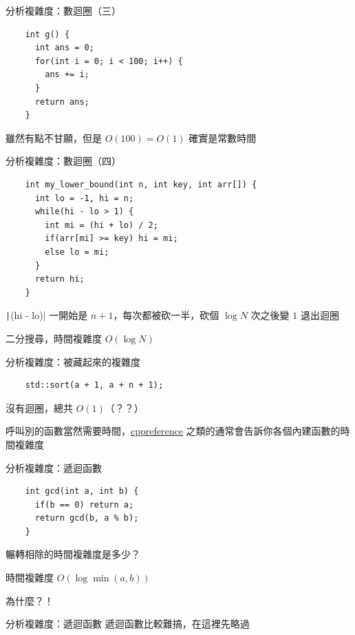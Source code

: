 \documentclass[aspectratio=169]{beamer}
\newcommand{\inc}[2][cpp]{\texttt|#2|}
\begin{document}
\begin{frame}[fragile]{分析複雜度：數迴圈（三）}
  \begin{verbatim}
    int g() {
      int ans = 0;
      for(int i = 0; i < 100; i++) {
        ans += i;
      }
      return ans;
    }
  \end{verbatim}

   {
    雖然有點不甘願，但是 $O(100) = O(1)$ 確實是常數時間
  }
\end{frame}

\begin{frame}[fragile]{分析複雜度：數迴圈（四）}
  \begin{verbatim}
    int my_lower_bound(int n, int key, int arr[]) {
      int lo = -1, hi = n;
      while(hi - lo > 1) {
        int mi = (hi + lo) / 2;
        if(arr[mi] >= key) hi = mi;
        else lo = mi;
      }
      return hi;
    }
  \end{verbatim}

   {
    \inc{(hi - lo)} 一開始是 $n + 1$，每次都被砍一半，砍個 $\log N$ 次之後變 $1$ 退出迴圈

    二分搜尋，時間複雜度 $O(\log N)$
  }
\end{frame}

\begin{frame}[fragile]{分析複雜度：被藏起來的複雜度}
  \begin{verbatim}
    std::sort(a + 1, a + n + 1);
  \end{verbatim}

  沒有迴圈，總共 $O(1)$（？？）

   {
    呼叫別的函數當然需要時間，\href{https://en.cppreference.com/w/}{cppreference} 之類的通常會告訴你各個內建函數的時間複雜度
  }
\end{frame}

\begin{frame}[fragile]{分析複雜度：遞迴函數}
  \begin{verbatim}
    int gcd(int a, int b) {
      if(b == 0) return a;
      return gcd(b, a % b);
    }
  \end{verbatim}
  
   {
    輾轉相除的時間複雜度是多少？
  }
   {
    時間複雜度 $O(\log \min(a, b))$

    為什麼？！
  }
\end{frame}

\begin{frame}[fragile]{分析複雜度：遞迴函數}
  遞迴函數比較難搞，在這裡先略過
\end{frame}
\end{document}
